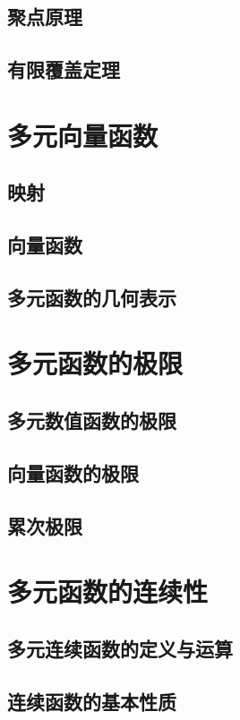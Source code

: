 \subsection{聚点原理}
\subsection{有限覆盖定理}
\begin{exercise}

\end{exercise}
\section{多元向量函数}
\subsection{映\emspace 射}
\subsection{向量函数}
\subsection{多元函数的几何表示}
\begin{exercise}

\end{exercise}
\section{多元函数的极限}
\subsection{多元数值函数的极限}
\subsection{向量函数的极限}
\subsection{累次极限}
\begin{exercise}

\end{exercise}
\section{多元函数的连续性}
\subsection{多元连续函数的定义与运算}
\subsection{连续函数的基本性质}
\begin{exercise}

\end{exercise}
\begin{exercise*}

\end{exercise*}




\endinput
